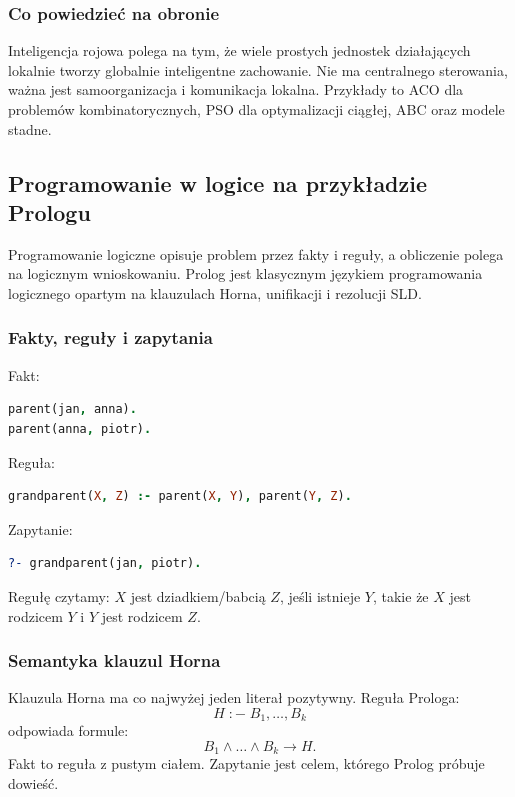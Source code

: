 \subsubsection{Co powiedzieć na obronie}

Inteligencja rojowa polega na tym, że wiele prostych jednostek działających lokalnie tworzy globalnie inteligentne zachowanie. Nie ma centralnego sterowania, ważna jest samoorganizacja i komunikacja lokalna. Przykłady to ACO dla problemów kombinatorycznych, PSO dla optymalizacji ciągłej, ABC oraz modele stadne.

\subsection{Programowanie w logice na przykładzie Prologu}

Programowanie logiczne opisuje problem przez fakty i reguły, a obliczenie polega na logicznym wnioskowaniu. Prolog jest klasycznym językiem programowania logicznego opartym na klauzulach Horna, unifikacji i rezolucji SLD.

\subsubsection{Fakty, reguły i zapytania}

Fakt:
\begin{lstlisting}[language=Prolog]
parent(jan, anna).
parent(anna, piotr).
\end{lstlisting}

Reguła:
\begin{lstlisting}[language=Prolog]
grandparent(X, Z) :- parent(X, Y), parent(Y, Z).
\end{lstlisting}

Zapytanie:
\begin{lstlisting}[language=Prolog]
?- grandparent(jan, piotr).
\end{lstlisting}

Regułę czytamy: $X$ jest dziadkiem/babcią $Z$, jeśli istnieje $Y$, takie że $X$ jest rodzicem $Y$ i $Y$ jest rodzicem $Z$.

\subsubsection{Semantyka klauzul Horna}

Klauzula Horna ma co najwyżej jeden literał pozytywny. Reguła Prologa:
\[
H\;:-\;B_1,\dots,B_k
\]
odpowiada formule:
\[
B_1\wedge\dots\wedge B_k\to H.
\]
Fakt to reguła z pustym ciałem. Zapytanie jest celem, którego Prolog próbuje dowieść.

